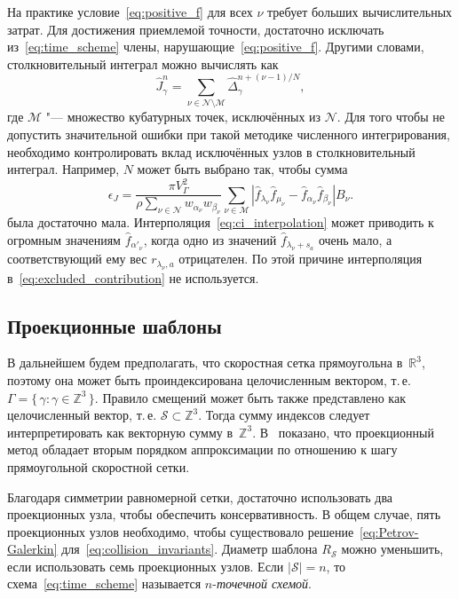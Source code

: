 \documentclass[
aps,%
12pt,%
final,%
notitlepage,%
oneside,%
onecolumn,%
nobibnotes,%
nofootinbib,%
superscriptaddress,%
noshowpacs,%
showkeys,%
floatfix,%
tightenlines,%
centertags]%
{revtex4}
\newcommand{\Nu}{\mathcal{N}}
\newcommand{\Mu}{\mathcal{M}}
\newcommand{\Set}[2]{\{\,{#1}:{#2}\,\}}
\begin{document}
На практике условие~\eqref{eq:positive_f} для всех \(\nu\) требует больших вычислительных затрат.
Для достижения приемлемой точности, достаточно исключать из~\eqref{eq:time_scheme} члены,
нарушающие~\eqref{eq:positive_f}. Другими словами, столкновительный интеграл можно вычислять как
\begin{equation}\label{eq:discrete_short_ci_discarded}
    \hat{J}_\gamma^n = \sum_{\nu\in\Nu\setminus\Mu} \hat{\Delta}_\gamma^{n+(\nu-1)/N},
\end{equation}
где \(\Mu\) "--- множество кубатурных точек, исключённых из \(\Nu\).
Для того чтобы не допустить значительной ошибки при такой методике численного интегрирования,
необходимо контролировать вклад исключённых узлов в столкновительный интеграл.
Например, \(N\) может быть выбрано так, чтобы сумма
\begin{equation}\label{eq:excluded_contribution}
    \epsilon_J = \frac{\pi V_\Gamma^2}{\rho\sum_{\nu\in\Nu} w_{\alpha_\nu}w_{\beta_\nu}}
        \sum_{\nu\in\Mu} \left|
            \hat{f}_{\lambda_\nu}\hat{f}_{\mu_\nu} - \hat{f}_{\alpha_\nu}\hat{f}_{\beta_\nu}
        \right|B_\nu.
\end{equation}
была достаточно мала.
Интерполяция~\eqref{eq:ci_interpolation} может приводить к огромным значениям \(\hat{f}_{\alpha'_\nu}\),
когда одно из значений \(\hat{f}_{\lambda_\nu+s_a}\) очень мало,
а соответствующий ему вес \(r_{\lambda_\nu,a}\) отрицателен.
По этой причине интерполяция в~\eqref{eq:excluded_contribution} не используется.

\subsection{Проекционные шаблоны}

В дальнейшем будем предполагать, что скоростная сетка прямоугольна в~\(\mathbb{R}^3\),
поэтому она может быть проиндексирована целочисленным вектором, т.\,е. \(\Gamma = \Set{\gamma}{\gamma\in\mathbb{Z}^3}\).
Правило смещений может быть также представлено как целочисленный вектор, т.\,е. \(\mathcal{S}\subset\mathbb{Z}^3\).
Тогда сумму индексов следует интерпретировать как векторную сумму в~\(\mathbb{Z}^3\).
В~\cite{Anikin2012} показано, что проекционный метод обладает вторым порядком аппроксимации
по отношению к шагу прямоугольной скоростной сетки.

Благодаря симметрии равномерной сетки,
достаточно использовать два проекционных узла, чтобы обеспечить консервативность.
В общем случае, пять проекционных узлов необходимо,
чтобы существовало решение~\eqref{eq:Petrov-Galerkin} для~\eqref{eq:collision_invariants}.
Диаметр шаблона \(R_\mathcal{S}\) можно уменьшить, если использовать семь проекционных узлов.
Если \(|\mathcal{S}|=n\), то схема~\eqref{eq:time_scheme} называется \(n\)-\emph{точечной схемой}.
\end{document}
